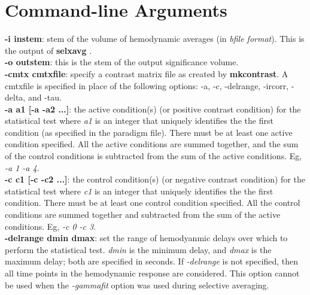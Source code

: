 \documentclass[10pt]{article}
\begin{document}
\section{Command-line Arguments}

\noindent
{\bf -i instem}: stem of the volume of hemodynamic averages (in {\em
bfile format}). This is the output of {\bf selxavg} .\\

\noindent
{\bf -o outstem}: this is the stem of the output significance volume.\\

\noindent
{\bf -cmtx cmtxfile}: specify a contrast matrix file as created by
{\bf mkcontrast}.  A cmtxfile is specified in place of the following 
options: -a, -c, -delrange, -ircorr, -delta, and -tau.\\

\noindent
{\bf -a a1 [-a -a2 ...]}: the active condition(s) (or positive
contrast condition) for the statistical test where {\em a1} is an
integer that uniquely identifies the the first condition (as specified
in the paradigm file).  There must be at least one active condition
specified.  All the active conditions are summed together, and the sum
of the control conditions is subtracted from the sum of the active
conditions.  Eg, {\em -a 1 -a 4}.\\

\noindent
{\bf -c c1 [-c -c2 ...]}: the control condition(s) (or negative
contrast condition) for the statistical test where {\em c1} is an
integer that uniquely identifies the the first condition.  There must
be at least one control condition specified.  All the control
conditions are summed together and subtracted from the sum of the
active conditions. Eg, {\em -c 0 -c 3}.\\

\noindent
{\bf -delrange dmin dmax}: set the range of hemodyanmic delays over
which to perform the statistical test.  {\em dmin} is the minimum
delay, and {\em dmax} is the maximum delay; both are specified in
seconds.  If {\em -delrange} is not specified, then all time points in
the hemodynamic response are considered. This option cannot be used
when the {\em -gammafit} option was used during selective averaging.\\
\end{document}
